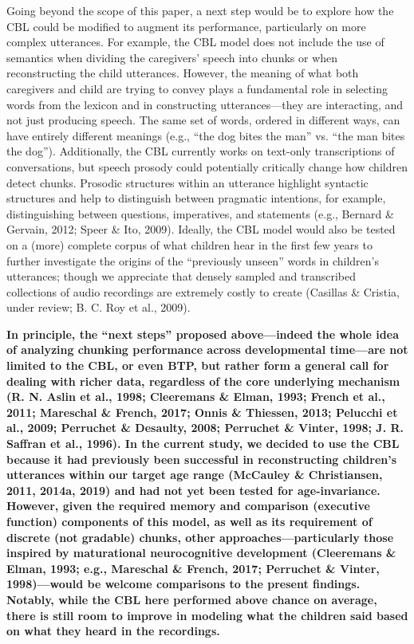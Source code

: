 \documentclass[man,mask,floatsintext]{apa6}
\begin{document}
Going beyond the scope of this paper, a next step would be to explore
how the CBL could be modified to augment its performance, particularly
on more complex utterances. For example, the CBL model does not include
the use of semantics when dividing the caregivers' speech into chunks or
when reconstructing the child utterances. However, the meaning of what
both caregivers and child are trying to convey plays a fundamental role
in selecting words from the lexicon and in constructing
utterances---they are interacting, and not just producing speech. The
same set of words, ordered in different ways, can have entirely
different meanings (e.g., \enquote{the dog bites the man} vs.
\enquote{the man bites the dog}). Additionally, the CBL currently works
on text-only transcriptions of conversations, but speech prosody could
potentially critically change how children detect chunks. Prosodic
structures within an utterance highlight syntactic structures and help
to distinguish between pragmatic intentions, for example, distinguishing
between questions, imperatives, and statements (e.g., Bernard \&
Gervain, 2012; Speer \& Ito, 2009). Ideally, the CBL model would also be
tested on a (more) complete corpus of what children hear in the first
few years to further investigate the origins of the \enquote{previously
unseen} words in children's utterances; though we appreciate that
densely sampled and transcribed collections of audio recordings are
extremely costly to create (Casillas \& Cristia, under review; B. C. Roy
et al., 2009).

\textbf{In principle, the \enquote{next steps} proposed above---indeed
the whole idea of analyzing chunking performance across developmental
time---are not limited to the CBL, or even BTP, but rather form a
general call for dealing with richer data, regardless of the core
underlying mechanism (R. N. Aslin et al., 1998; Cleeremans \& Elman,
1993; French et al., 2011; Mareschal \& French, 2017; Onnis \& Thiessen,
2013; Pelucchi et al., 2009; Perruchet \& Desaulty, 2008; Perruchet \&
Vinter, 1998; J. R. Saffran et al., 1996). In the current study, we
decided to use the CBL because it had previously been successful in
reconstructing children's utterances within our target age range
(McCauley \& Christiansen, 2011, 2014a, 2019) and had not yet been
tested for age-invariance. However, given the required memory and
comparison (executive function) components of this model, as well as its
requirement of discrete (not gradable) chunks, other
approaches---particularly those inspired by maturational neurocognitive
development (Cleeremans \& Elman, 1993; e.g., Mareschal \& French, 2017;
Perruchet \& Vinter, 1998)---would be welcome comparisons to the present
findings. Notably, while the CBL here performed above chance on average,
there is still room to improve in modeling what the children said based
on what they heard in the recordings.}
\end{document}
